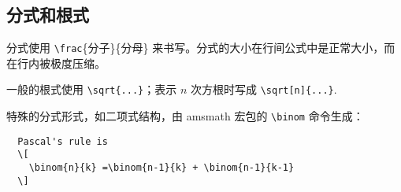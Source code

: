 \subsection{分式和根式}
分式使用 \verb|\frac|\{分子\}\{分母\} 来书写。分式的大小在行间公式中是正常大小，而在行内被极度压缩。
\begin{center}
\end{center}
一般的根式使用 \verb|\sqrt{...}|；表示 $n$ 次方根时写成 \verb|\sqrt[n]{...}|.
\begin{center}
\end{center}
特殊的分式形式，如二项式结构，由 amsmath 宏包的 \verb|\binom| 命令生成：
\begin{lstlisting}
  Pascal's rule is
  \[
    \binom{n}{k} =\binom{n-1}{k} + \binom{n-1}{k-1}
  \]
\end{lstlisting}
\begin{center}
\end{center}
